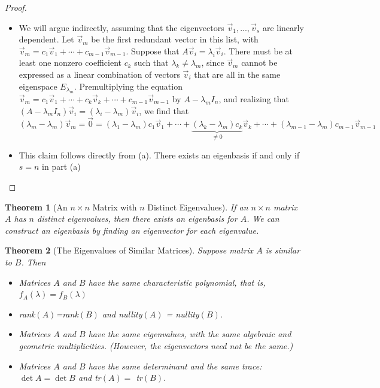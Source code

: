 \documentclass[10pt]{report}
\newtheorem{thm2}{Theorem}[section]
\begin{document}
\begin{proof}
\begin{itemize}
\item[a.] We will argue indirectly, assuming that the eigenvectors $\vec{v}_1,...,\vec{v}_s$ are linearly dependent. Let $\vec{v}_m$ be the first redundant vector in this list, with $\vec{v}_m = c_1\vec{v}_1 + \cdots + c_{m-1}\vec{v}_{m-1}$. Suppose that $A\vec{v}_i=\lambda_i\vec{v}_i$. There must be at least one nonzero coefficient $c_k$ such that $\lambda_k\neq \lambda_m$, since $\vec{v}_m$ cannot be expressed as a linear combination of vectors $\vec{v}_i$ that are all in the same eigenspace $E_{\lambda_m}$. Premultiplying the equation $\vec{v}_m = c_1\vec{v}_1+\cdots + c_k\vec{v}_k + \cdots + c_{m-1}\vec{v}_{m-1}$ by $A-\lambda_mI_n$, and realizing that $(A - \lambda_mI_n) \vec{v}_i = ( \lambda_i - \lambda_m) \vec{v}_i$, we find that $(\lambda_m-\lambda_m) \vec{v}_m=\vec{0} = (\lambda_1 - \lambda_m)c_1\vec{v}_1 + \cdots + \underbrace{(\lambda_k - \lambda_m)c_k}_{\neq 0}\vec{v}_k + \cdots + (\lambda_{m-1}-\lambda_m)c_{m-1} \vec{v}_{m-1}$
\item[b.] This claim follows directly from (a). There exists an eigenbasis if and only if $s=n$ in part (a)
\end{itemize}
\end{proof}
\begin{thm2}[An $n\times n$ Matrix with $n$ Distinct Eigenvalues]
If an $n\times n$ matrix $A$ has $n$ distinct eigenvalues, then there exists an eigenbasis for $A$. We can construct an eigenbasis by finding an eigenvector for each eigenvalue.
\end{thm2}
\begin{thm2}[The Eigenvalues of Similar Matrices]
Suppose matrix $A$ is similar to $B$. Then
\begin{itemize}
\item[a.] Matrices $A$ and $B$ have the same characteristic polynomial, that is, $f_A(\lambda) = f_B(\lambda)$
\item[b.] rank$(A)$=rank$(B)$ and nullity$(A)$ = nullity$(B)$.
\item[c.] Matrices $A$ and $B$ have the same eigenvalues, with the same algebraic and geometric multiplicities. (However, the eigenvectors need not be the same.)
\item[d.] Matrices $A$ and $B$ have the same determinant and the same trace: $\det A = \det B$ and tr$(A) =$ tr$(B)$.
\end{itemize}
\end{thm2}
\end{document}
